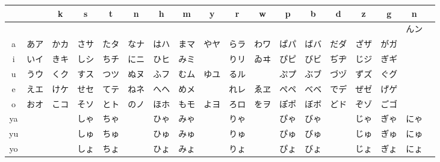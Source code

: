 \documentclass{article}
\begin{document}
\begin{CJK}{UTF8}{min}
\begin{center}\Large
	\begin{tabular}{c|ccccccccccccccccc}
			&	&k	&s	&t	&n	&h	&m	&y	&r	&w	&p	&b	&d	&z	&g	&n	\\
		\hline
			&	&	&	&	&	&	&	&	&	&	&	&	&	&	&	&んン	\\
		a	&あア	&かカ	&さサ	&たタ	&なナ	&はハ	&まマ	&やヤ	&らラ	&わワ	&ぱパ	&ばバ	&だダ	&ざザ	&がガ	&	\\
		i	&いイ	&きキ	&しシ	&ちチ	&にニ	&ひヒ	&みミ	&	&りリ	&ゐヰ	&ぴピ	&びビ	&ぢヂ	&じジ	&ぎギ	&	\\
		u	&うウ	&くク	&すス	&つツ	&ぬヌ	&ふフ	&むム	&ゆユ	&るル	&	&ぷプ	&ぶブ	&づヅ	&ずズ	&ぐグ	&	\\
		e	&えエ	&けケ	&せセ	&てテ	&ねネ	&へヘ	&めメ	&	&れレ	&ゑヱ	&ぺペ	&べベ	&でデ	&ぜゼ	&げゲ	&	\\
		o	&おオ	&こコ	&そソ	&とト	&のノ	&ほホ	&もモ	&よヨ	&ろロ	&をヲ	&ぽポ	&ぼボ	&どド	&ぞゾ	&ごゴ	&	\\
		ya	&	&	&しゃ	&ちゃ	&	&ひゃ	&みゃ	&	&りゃ	&	&ぴゃ	&びゃ	&	&じゃ	&ぎゃ	&にゃ	\\
		yu	&	&	&しゅ	&ちゅ	&	&ひゅ	&みゅ	&	&りゅ	&	&ぴゅ	&びゅ	&	&じゅ	&ぎゅ	&にゅ	\\
		yo	&	&	&しょ	&ちょ	&	&ひょ	&みょ	&	&りょ	&	&ぴょ	&びょ	&	&じょ	&ぎょ	&にょ
	\end{tabular}
\end{center}
\end{CJK}
\end{document}
